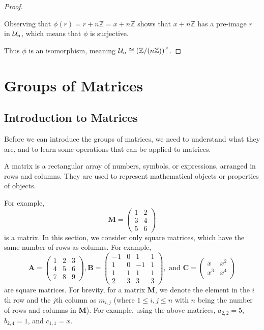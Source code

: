 \begin{proof}
\begin{itemize}
        Observing that $\phi(r) = r + n\mathbb{Z} = x + n\mathbb{Z}$ shows that $x + n\mathbb{Z}$ has a pre-image $r$ in $\mathcal{U}_{n}$, which means that $\phi$ is surjective.
    \end{itemize}

    Thus $\phi$ is an isomorphism, meaning $\mathcal{U}_{n} \cong \left(\mathbb{Z}/(n\mathbb{Z})\right)^{\times}$.
\end{proof}

\section{Groups of Matrices}
\subsection{Introduction to Matrices}
Before we can introduce the groups of matrices, we need to understand what they are, and to learn some operations that can be applied to matrices.

A matrix is a rectangular array of numbers, symbols, or expressions, arranged in rows and columns. They are used to represent mathematical objects or properties of objects.

For example,
\[
    \textbf{M} = \begin{pmatrix}
    1 & 2\\
    3 & 4\\
    5 & 6
    \end{pmatrix}
\]
is a matrix. In this section, we consider only square matrices, which have the same number of rows as columns. For example,
\[
    \textbf{A} = \begin{pmatrix}
    1 & 2 & 3\\
    4 & 5 & 6\\
    7 & 8 & 9
    \end{pmatrix}, \textbf{B} = \begin{pmatrix}
    -1 & 0 & 1 & 1\\
    1 & 0 & -1 & 1\\
    1 & 1 & 1 & 1\\
    2 & 3 & 3 & 3
    \end{pmatrix}, \textrm{ and } \textbf{C} = \begin{pmatrix}
    x & x^2\\
    x^3 & x^4\\
    \end{pmatrix}
\]
are square matrices. For brevity, for a matrix \textbf{M}, we denote the element in the $i$th row and the $j$th column as $m_{i,j}$ (where $1 \leq i, j \leq n$ with $n$ being the number of rows and columns in \textbf{M}). For example, using the above matrices, $a_{2,2} = 5$, $b_{2,4}=1$, and $c_{1,1} = x$.

